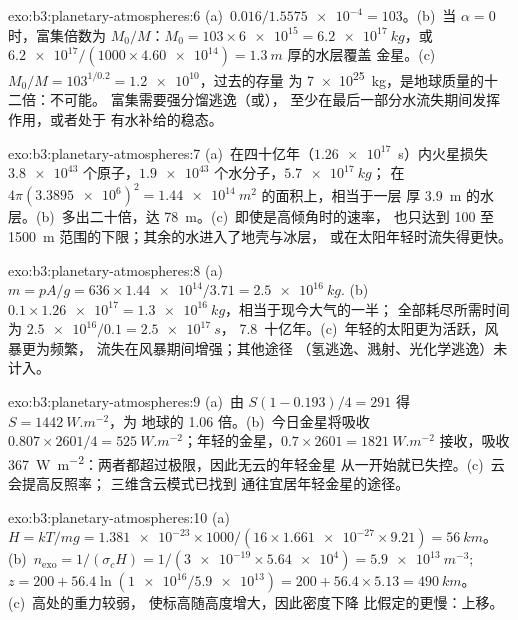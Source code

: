 \begin{solution}{exo:b3:planetary-atmospheres:6}
(a)~$0.016/\num{1.5575e-4} = 103$。(b)~当 $\alpha = 0$ 时，富集倍数为
$M_0/M$：$M_0 = 103\times\num{6e15} = \qty{6.2e17}{kg}$，或
$\num{6.2e17}/(1000\times\num{4.60e14}) = \qty{1.3}{m}$ 厚的水层覆盖
金星。(c)~$M_0/M = 103^{1/0.2} = \num{1.2e10}$，过去的存量
为 \qty{7e25}{kg}，是地球质量的十二倍：不可能。
富集需要强分馏逃逸（或），
至少在最后一部分水流失期间发挥作用，或者处于
有水补给的稳态。
\end{solution}

\begin{solution}{exo:b3:planetary-atmospheres:7}
(a)~在四十亿年（$\num{1.26e17}$~s）内火星损失
$\num{3.8e43}$ 个原子，$\num{1.9e43}$ 个水分子，$\qty{5.7e17}{kg}$；
在 $4\pi(\num{3.3895e6})^2 = \qty{1.44e14}{m^2}$ 的面积上，相当于一层
厚 \qty{3.9}{m} 的水层。(b)~多出二十倍，达 \qty{78}{m}。(c)~即使是高倾角时的速率，
也只达到 100 至
\qty{1500}{m} 范围的下限；其余的水进入了地壳与冰层，
或在太阳年轻时流失得更快。
\end{solution}

\begin{solution}{exo:b3:planetary-atmospheres:8}
(a)~$m = pA/g = 636\times\num{1.44e14}/3.71 = \qty{2.5e16}{kg}$.
(b)~$0.1\times\num{1.26e17} = \qty{1.3e16}{kg}$，相当于现今大气的一半；
全部耗尽所需时间为 $\num{2.5e16}/0.1 = \qty{2.5e17}{s}$，
\num{7.8}~十亿年。(c)~年轻的太阳更为活跃，风暴更为频繁，
流失在风暴期间增强；其他途径
（氢逃逸、溅射、光化学逃逸）未计入。
\end{solution}

\begin{solution}{exo:b3:planetary-atmospheres:9}
(a)~由 $S(1 - 0.193)/4 = 291$ 得 $S = \qty{1442}{W.m^{-2}}$，为
地球的 1.06 倍。(b)~今日金星将吸收 $0.807\times2601/4 =
\qty{525}{W.m^{-2}}$；年轻的金星，$0.7\times2601 = \qty{1821}{W.m^{-2}}$
接收，吸收 \qty{367}{W.m^{-2}}：两者都超过极限，因此无云的年轻金星
从一开始就已失控。(c)~云会提高反照率；
三维含云模式已找到
通往宜居年轻金星的途径。
\end{solution}

\begin{solution}{exo:b3:planetary-atmospheres:10}
(a)~$H = kT/mg = \num{1.381e-23}\times1000/(16\times\num{1.661e-27}\times9.21)
= \qty{56}{km}$。(b)~$n_\mathrm{exo} = 1/(\sigma_c H) = 1/(\num{3e-19}\times
\num{5.64e4}) = \qty{5.9e13}{m^{-3}}$; $z = 200 + 56.4\ln(\num{1e16}/
\num{5.9e13}) = 200 + 56.4\times5.13 = \qty{490}{km}$。(c)~高处的重力较弱，
使标高随高度增大，因此密度下降
比假定的更慢：上移。
\end{solution}

